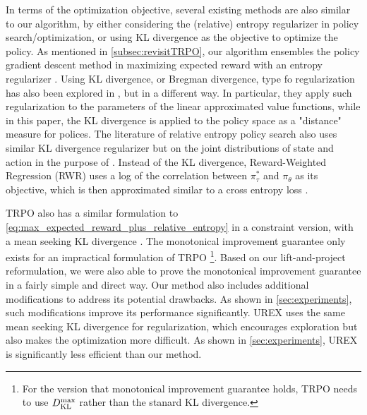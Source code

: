 
In terms of the optimization objective, several existing methods are also similar to our algorithm,
by either considering the (relative) entropy regularizer in policy search/optimization, or using KL divergence as the objective to optimize the policy. 
As mentioned in \cref{subsec:revisitTRPO}, our algorithm ensembles
the policy gradient descent method in maximizing expected reward with an entropy regularizer \citep{williams1991function,fox2015taming,nachum2017bridging}.
Using KL divergence, or Bregman divergence, type fo regularization has also been explored  in \citet{liu2015finite,thomas2013projected,mahadevan2012sparse}, but in a different way. 
In particular, they apply such regularization to the parameters of the  linear approximated value functions, while in this paper, the KL divergence is applied to the policy space as a "distance" measure for polices. 
The literature of relative entropy policy search also uses similar KL divergence regularizer \citep{peters2010relative,van2015learning} but on the joint distributions of state and action in the purpose of . 
Instead of the KL divergence, Reward-Weighted Regression (RWR) uses a log of the correlation between $\pi^*_\tau$ and $\pi_\theta$ as its objective, which is then approximated similar to a cross entropy loss \citep{peters2007reinforcement,wierstra2008episodic}.

TRPO also has a similar formulation to \cref{eq:max_expected_reward_plus_relative_entropy} in a constraint version, with a mean seeking KL divergence \citep{schulman2015trust}. 
The monotonical improvement guarantee
only exists for an impractical formulation of TRPO \footnote{For the version that monotonical improvement guarantee holds, TRPO needs to use $D_{\mathrm{KL}}^{\max} $ rather than the stanard KL divergence.}. 
Based on our lift-and-project reformulation, we were also able to prove the monotonical improvement guarantee in a fairly simple and direct way.
Our method also includes additional modifications to address its potential drawbacks. As shown in \ref{sec:experiments}, such modifications improve its performance significantly.
UREX uses the same mean seeking KL divergence for regularization, which encourages exploration but also makes the optimization more difficult. As shown in \ref{sec:experiments}, UREX is significantly less efficient than our method. 

